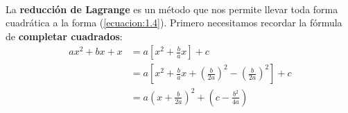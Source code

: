 \paragraph{}

La \textbf{reducción de Lagrange} es un método que nos permite llevar toda forma cuadrática a la forma (\ref{ecuacion:1.4}). Primero necesitamos recordar la fórmula de \textbf{completar cuadrados}:
\begin{equation}
\begin{split}
ax^{2} + bx + x & = a\left[x^{2} + \frac{b}{a}x \right] + c\\
 & = a\left[x^{2} + \frac{b}{a}x + \left(\frac{b}{2a}\right)^{2} - \left(\frac{b}{2a}\right)^{2} \right] + c\\
 & = a\left(x + \frac{b}{2a}\right)^{2} + \left(c - \frac{b^{2}}{4a} \right)
\end{split}
\label{ecuacion:2.2}
\end{equation}
